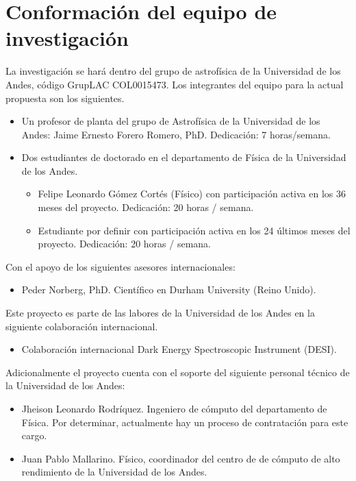 \section{Conformaci\'on del equipo de investigaci\'on}

La investigaci\'on se har\'a dentro del grupo de astrof\'isica de la
Universidad de los Andes, c\'odigo GrupLAC COL0015473. 
Los integrantes del equipo para la actual propuesta son los
siguientes.  


\begin{itemize}
\item Un profesor de planta del grupo de Astrof\'isica de la
  Universidad de los Andes: Jaime Ernesto  Forero Romero, PhD.
  Dedicaci\'on: 7 horas/semana.
\item Dos estudiantes de doctorado en el departamento de F\'isica de
  la Universidad de los Andes.
\begin{itemize}
\item Felipe Leonardo G\'omez Cort\'es (F\'isico) con participaci\'on
  activa en los 36 meses del proyecto. Dedicaci\'on: 20 horas /
  semana.   
\item Estudiante por definir con participaci\'on activa en los 24 \'ultimos
  meses del proyecto. Dedicaci\'on: 20 horas / semana.  
\end{itemize}
\end{itemize}

\noindent

Con el apoyo de los siguientes asesores internacionales:

\begin{itemize}
\item Peder Norberg, PhD. Cient\'ifico en Durham University (Reino Unido).
\end{itemize}

Este proyecto es parte de las labores de la Universidad de los Andes
en la siguiente colaboraci\'on internacional.

\begin{itemize}
\item Colaboraci\'on internacional Dark Energy Spectroscopic Instrument
(DESI). 
\end{itemize}

\noindent
Adicionalmente el proyecto cuenta con el soporte del siguiente
personal t\'ecnico de la Universidad de los Andes:

\begin{itemize}
\item{Jheison Leonardo Rodr\'iquez. Ingeniero de c\'omputo del
  departamento de F\'isica. Por determinar, actualmente hay un proceso
  de contratación para este cargo.} 
\item{Juan Pablo Mallarino. F\'isico, coordinador del centro de de
  c\'omputo de alto rendimiento de la Universidad de los Andes.}
\end{itemize}
